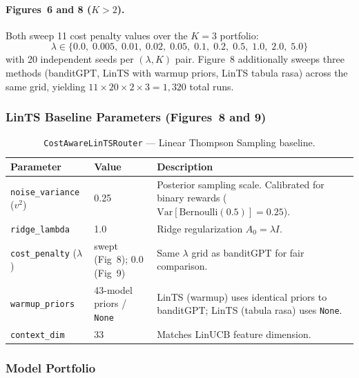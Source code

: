 \paragraph{Figures~6 and 8 ($K{>}2$).}
Both sweep 11 cost penalty values over the $K{=}3$ portfolio:
\begin{equation*}
\lambda \in \{0.0,\; 0.005,\; 0.01,\; 0.02,\; 0.05,\; 0.1,\; 0.2,\; 0.5,\; 1.0,\; 2.0,\; 5.0\}
\end{equation*}
with 20 independent seeds per $(\lambda, K)$ pair.
Figure~8 additionally sweeps three methods (banditGPT, LinTS with warmup priors,
LinTS tabula rasa) across the same grid, yielding $11 \times 20 \times 2 \times 3 = 1{,}320$ total runs.

\subsubsection{LinTS Baseline Parameters (Figures~8 and 9)}

\begin{table}[h]
\centering
\caption{\texttt{CostAwareLinTSRouter} --- Linear Thompson Sampling baseline.}
\label{tab:lints_params}
\small
\begin{tabular}{@{}llp{6.5cm}@{}}
\toprule
\textbf{Parameter} & \textbf{Value} & \textbf{Description} \\
\midrule
\texttt{noise\_variance} ($v^2$) & 0.25 & Posterior sampling scale.  Calibrated for binary rewards ($\text{Var}[\text{Bernoulli}(0.5)] = 0.25$). \\
\texttt{ridge\_lambda} & 1.0 & Ridge regularization $A_0 = \lambda I$. \\
\texttt{cost\_penalty} ($\lambda$) & swept (Fig~8); 0.0 (Fig~9) & Same $\lambda$ grid as banditGPT for fair comparison. \\
\texttt{warmup\_priors} & 43-model priors / \texttt{None} & LinTS (warmup) uses identical priors to banditGPT; LinTS (tabula rasa) uses \texttt{None}. \\
\texttt{context\_dim} & 33 & Matches LinUCB feature dimension. \\
\bottomrule
\end{tabular}
\end{table}

\subsubsection{Model Portfolio}

